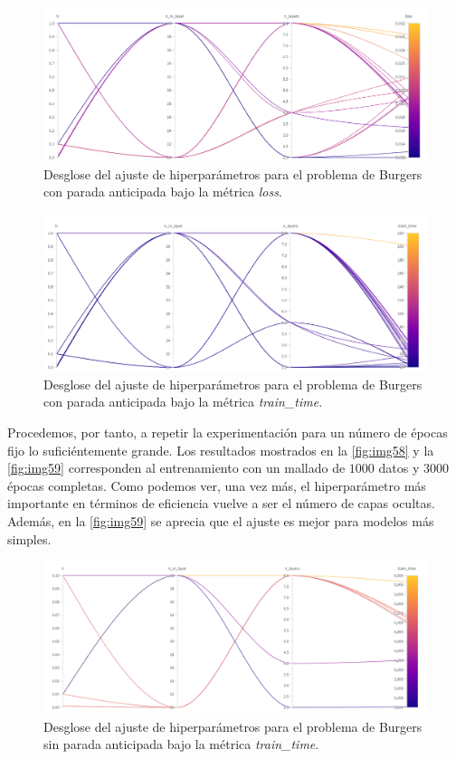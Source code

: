 \begin{figure}[htbp]
    \centering
    \includegraphics[width=1\textwidth]{img/img52.png}
    \caption{Desglose del ajuste de hiperparámetros para el problema de Burgers con parada anticipada bajo la métrica \textit{loss}.}
    \label{fig:img52}
\end{figure}

\begin{figure}[htbp]
    \centering
    \includegraphics[width=1\textwidth]{img/img53.png}
    \caption{Desglose del ajuste de hiperparámetros para el problema de Burgers con parada anticipada bajo la métrica \textit{train\_time}.}
    \label{fig:img53}
\end{figure}


Procedemos, por tanto, a repetir la experimentación para un número de épocas fijo lo suficiéntemente grande. Los resultados mostrados en la \autoref{fig:img58} y la \autoref{fig:img59} corresponden al entrenamiento con un mallado de $1000$ datos y $3000$ épocas completas. Como podemos ver, una vez más, el hiperparámetro más importante en términos de eficiencia vuelve a ser el número de capas ocultas. Además, en la  \autoref{fig:img59} se aprecia que el ajuste es mejor para modelos más simples. 

\begin{figure}[htbp]
    \centering
    \includegraphics[width=1\textwidth]{img/img58.png}
    \caption{Desglose del ajuste de hiperparámetros para el problema de Burgers sin parada anticipada bajo la métrica \textit{train\_time}.}
    \label{fig:img58}
\end{figure}

